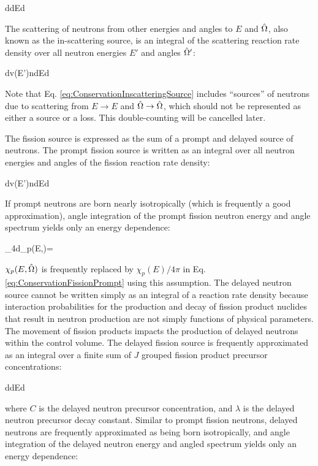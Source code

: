\beq
\label{eq:ConservationExternalSource}
\left\lbrack\int d\volume \source \right\rbrack dEd\hO  
\eeq

The scattering of neutrons from other energies and angles to \(E\) and \(\hat{\Omega}\), also known as the in-scattering source, is an integral of the scattering reaction rate density over all neutron energies \(E'\) and angles \(\hat{\Omega}'\):

\beq
\label{eq:ConservationInscatteringSource}
\left\lbrack\int d\volume\inscatteringsource v(E')n\seatelse\right\rbrack dEd\hO  
\eeq

Note that Eq. \eqref{eq:ConservationInscatteringSource} includes ``sources'' of neutrons due to scattering from \(E\rightarrow E\) and \(\hat{\Omega}\rightarrow\hat{\Omega}\), which should not be represented as either a source or a loss. This double-counting will be cancelled later.

The fission source is expressed as the sum of a prompt and delayed source of neutrons. The prompt fission source is written as an integral over all neutron energies and angles of the fission reaction rate density:

\beq
\label{eq:ConservationFissionPrompt}
\left\lbrack\int d\volume\promptfissionsource v(E')n\seatelse\right\rbrack dEd\hO
\eeq

If prompt neutrons are born nearly isotropically (which is frequently a good approximation), angle integration of the prompt fission neutron energy and angle spectrum yields only an energy dependence:

\beq
\label{eq:prompt_isotropic}
\int_{4\pi}d\hO \chi_p(E,\hO)=
\eeq

\(\chi_p(E,\hat{\Omega})\) is frequently replaced by \(\chi_p(E)/4\pi\) in Eq. \eqref{eq:ConservationFissionPrompt} using this assumption. The delayed neutron source cannot be written simply as an integral of a reaction rate density because interaction probabilities for the production and decay of fission product nuclides that result in neutron production are not simply functions of physical parameters. The movement of fission products impacts the production of delayed neutrons within the control volume. The delayed fission source is frequently approximated as an integral over a finite sum of \(J\) grouped fission product precursor concentrations:

\beq
\label{eq:ConservationFissionDelayed}
\left\lbrack\int d\volume \delayedfissionsource\right\rbrack dEd\hO  
\eeq

where \(C\) is the delayed neutron precursor concentration, and \(\lambda\) is the delayed neutron precursor decay constant. Similar to prompt fission neutrons, delayed neutrons are frequently approximated as being born isotropically, and angle integration of the delayed neutron energy and angled spectrum yields only an energy dependence:

